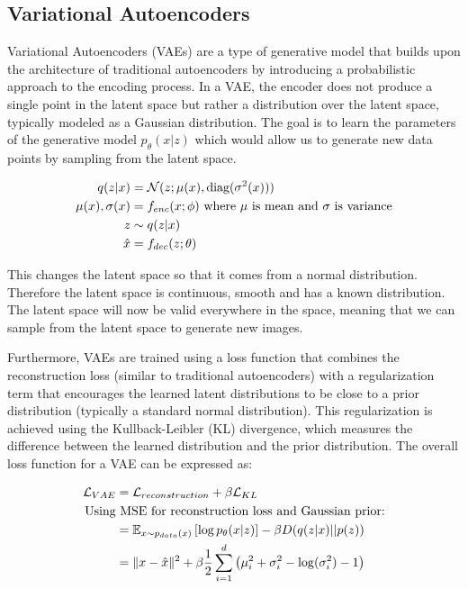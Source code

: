 \documentclass[conference,a4paper]{IEEEtran}
\begin{document}
\subsection{Variational Autoencoders}

Variational Autoencoders (VAEs) are a type of generative model that builds upon the architecture of traditional autoencoders by introducing a probabilistic approach to the encoding process. In a VAE, the encoder does not produce a single point in the latent space but rather a distribution over the latent space, typically modeled as a Gaussian distribution. The goal is to learn the parameters of the generative model $p_{\theta}(x|z)$ which would allow us to generate new data points by sampling from the latent space.

\begin{align}
q(z|x) &= \mathcal{N}(z; \mu(x),\text{diag}(\sigma^2(x)))\\
\mu(x), \sigma(x) &= f_{enc}(x; \phi) \text{ where } \mu \text{ is mean and } \sigma \text{ is variance} \notag \\
z &\sim q(z|x)\\
\hat{x} &= f_{dec}(z; \theta)
\end{align}

This changes the latent space so that it comes from a normal distribution. Therefore the latent space is continuous, smooth and has a known distribution. The latent space will now be valid everywhere in the space, meaning that we can sample from the latent space to generate new images.

Furthermore, VAEs are trained using a loss function that combines the reconstruction loss (similar to traditional autoencoders) with a regularization term that encourages the learned latent distributions to be close to a prior distribution (typically a standard normal distribution). This regularization is achieved using the Kullback-Leibler (KL) divergence, which measures the difference between the learned distribution and the prior distribution. The overall loss function for a VAE can be expressed as:

\begin{align}
\mathcal{L}_{VAE} &= \mathcal{L}_{reconstruction} + \beta \mathcal{L}_{KL}\\
\text{Using}&\text{ MSE for reconstruction loss and Gaussian prior:} \notag\\
&= \mathbb{E}_{x \sim p_{data}(x)}\left[\log p_{\theta}(x|z)\right] - \beta D(q(z|x)||p(z)) \notag\\
&= \| x - \hat{x} \|^2 + \beta \frac{1}{2} \sum_{i=1}^{d} \left( \mu_i^2 + \sigma_i^2 - \log(\sigma_i^2) - 1 \right)
\end{align}
\end{document}
